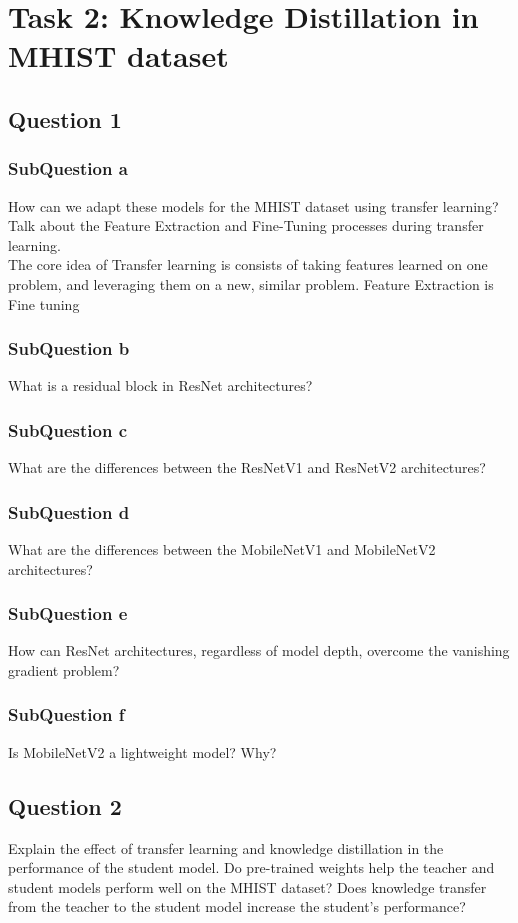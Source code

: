 \documentclass[conference]{IEEEtran}
\begin{document}
\section{Task 2: Knowledge Distillation in MHIST dataset}

\subsection{Question 1}
\subsubsection{SubQuestion a} How can we adapt these models for the MHIST dataset using transfer learning? Talk about the Feature Extraction and Fine-Tuning processes during transfer learning.\\

The core idea of Transfer learning is consists of taking features learned on one problem, and leveraging them on a new, similar problem.\cite{keras}
Feature Extraction is 
\\
Fine tuning
\cite{blog}
\subsubsection{SubQuestion b} What is a residual block in ResNet architectures?
\subsubsection{SubQuestion c} What are the differences between the ResNetV1 and ResNetV2 architectures?
\subsubsection{SubQuestion d} What are the differences between the MobileNetV1 and MobileNetV2 architectures?
\subsubsection{SubQuestion e} How can ResNet architectures, regardless of model depth, overcome the vanishing gradient problem?
\subsubsection{SubQuestion f} Is MobileNetV2 a lightweight model? Why?
\subsection{Question 2} Explain the effect of transfer learning and knowledge distillation in the performance of the student model. Do pre-trained weights help the teacher and student models perform well on the MHIST dataset? Does knowledge transfer from the teacher to the student model increase the student’s performance?
\end{document}
